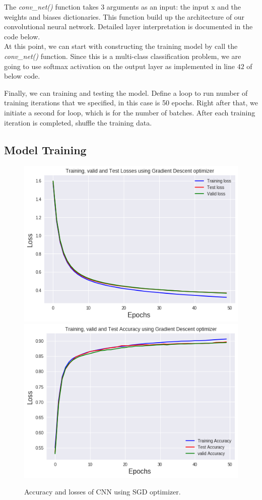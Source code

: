 \documentclass[10pt,letterpaper]{article}
\begin{document}


The \textit{conv\_net()} function takes 3 arguments as an input: the input x and the weights and biases dictionaries. This function build up the architecture of our convolutional neural network. Detailed layer interpretation is documented in the code below. \\

At this point, we can start with constructing the training model by call the \textit{conv\_net()} function. Since this is a multi-class classification problem, we are going to use softmax activation on the output layer as implemented in line $42$ of below code. 



Finally, we can training and testing the model. Define a loop to run number of training iterations that we specified, in this case is 50 epochs. Right after that, we initiate a second for loop, which is for the number of batches. After each training iteration is completed, shuffle the training data. 



\subsection{Model Training}
\begin{figure}[H]
\centering

  \includegraphics[width=.4\linewidth]{img/p2_2_SGD_loss.png}\hfill
  \includegraphics[width=.4\linewidth]{img/p2_2_SGD_acc.png}\hfill
  \caption{Accuracy and losses of CNN using SGD optimizer.}

\end{figure}
\end{document}
